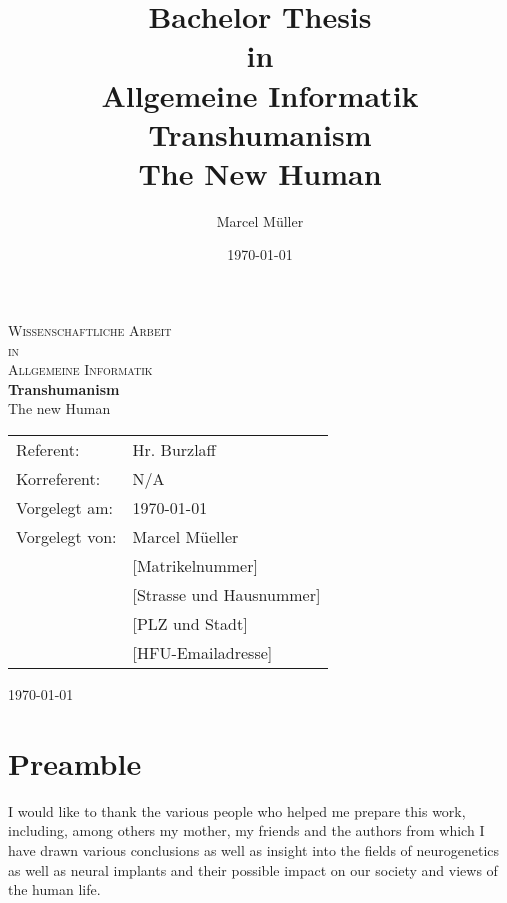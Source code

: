 \documentclass[
			12pt,
			a4paper,
			cleardoublepage=empty,
			final,
			twoside
				]{scrbook}
\title{\fontsize{14}{14}Bachelor Thesis \\ in \\Allgemeine Informatik
\fontsize{22}{22}\textbf{Transhumanism}\\
\fontsize{18}{18} The New Human}
\author{Marcel M\"uller}
\date{\today}
\begin{document}
\setcounter{secnumdepth}{3}


\begin{titlepage}
\begin{center}


\fontsize{18}{18}
\textsc{Wissenschaftliche Arbeit \\[0.5cm] in \\[0.5cm] Allgemeine Informatik}\\[1.5cm]

\fontsize{22}{22}
{ \bfseries Transhumanism \\[0.4cm] }
\fontsize{18}{18}
{ The new Human\\[10cm] }

\begin{tabular}{l l}
	 Referent:  & Hr. Burzlaff \\
	 Korreferent: & N/A\\
	 Vorgelegt am: & \today\\ %
	 Vorgelegt von: & Marcel M\"ueller\\
	 & [Matrikelnummer] \\
	 & [Strasse und Hausnummer] \\
	 & [PLZ und Stadt] \\
	 & [HFU-Emailadresse]\\
\end{tabular}

\vfill

{\large \today}

\end{center}
\end{titlepage}

\frontmatter

\section{Preamble}

\begin{par}
	
	I would like to thank the various people who helped me prepare this work, including, among others my mother, my friends and the authors from which I have drawn various conclusions as well as insight into the fields of neurogenetics as well as neural implants and their possible impact on our society and views of the human life.
	
\end{par}

\newpage
\end{document}

